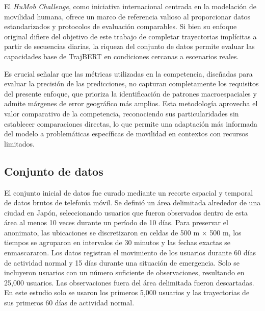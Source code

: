El \textit{HuMob Challenge}, como iniciativa internacional centrada en la modelación de movilidad humana, ofrece un marco de referencia valioso al proporcionar datos estandarizados y protocolos de evaluación comparables. Si bien su enfoque original difiere del objetivo de este trabajo de completar trayectorias implícitas a partir de secuencias diarias, la riqueza del conjunto de datos permite evaluar las capacidades base de TrajBERT en condiciones cercanas a escenarios reales. 

Es crucial señalar que las métricas utilizadas en la competencia, diseñadas para evaluar la precisión de las predicciones, no capturan completamente los requisitos del presente enfoque, que prioriza la identificación de patrones macroespaciales y admite márgenes de error geográfico más amplios. Esta metodología aprovecha el valor comparativo de la competencia, reconociendo sus particularidades sin establecer comparaciones directas, lo que permite una adaptación más informada del modelo a problemáticas específicas de movilidad en contextos con recursos limitados.

\subsection{Conjunto de datos}

El conjunto inicial de datos fue curado mediante un recorte espacial y temporal de datos brutos de telefonía móvil. Se definió un área delimitada alrededor de una ciudad en Japón, seleccionando usuarios que fueron observados dentro de esta área al menos 10 veces durante un período de 10 días. Para preservar el anonimato, las ubicaciones se discretizaron en celdas de 500 m × 500 m, los tiempos se agruparon en intervalos de 30 minutos y las fechas exactas se enmascararon. Los datos registran el movimiento de los usuarios durante 60 días de actividad normal y 15 días durante una situación de emergencia. Solo se incluyeron usuarios con un número suficiente de observaciones, resultando en 25,000 usuarios. Las observaciones fuera del área delimitada fueron descartadas. En este estudio solo se usaron los primeros 5,000 usuarios y las trayectorias de sus primeros 60 días de actividad normal. 

